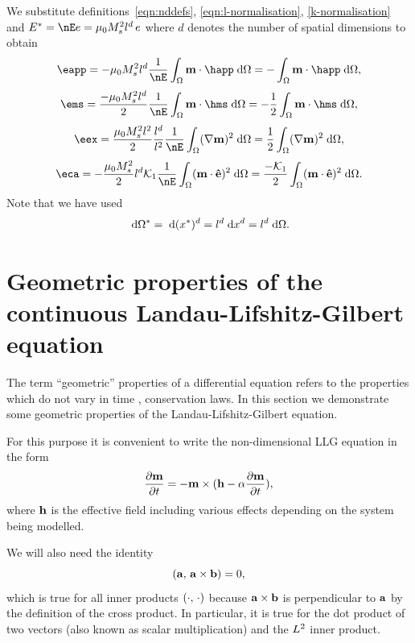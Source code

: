 We substitute definitions~\cref{eqn:nddefs}, \cref{eqn:l-normalisation}, \cref{k-normalisation} and $E^* = \nE e = \mu_0 M_s^2 l^d \, e$ where $d$ denotes the number of spatial dimensions to obtain
\begin{equation*}
  \eapp = -\mu_0 M_s^2 l^d \frac{1}{\nE} \int_{\magd} \mv \cdot \happ \d \magd
  = - \int_{\magd} \mv \cdot \happ \d \magd,
\end{equation*}
\begin{equation}
  \ems = \frac{-\mu_0 M_s^2 l^d}{2} \frac{1}{\nE} \int_{\magd} \mv \cdot \hms \d \magd
  = -\frac{1}{2} \int_{\magd} \mv \cdot \hms \d \magd,
\end{equation}
\begin{equation*}
  \eex =  \frac{\mu_0 M_s^2 l^2}{2} \frac{l^d}{l^2} \frac{1}{\nE} \int_{\magd} (\nabla \mv)^2 \d \magd
  = \frac{1}{2} \int_{\magd} (\nabla \mv)^2 \d \magd,
\end{equation*}
\begin{equation*}
  \eca = - \frac{\mu_0 M_s^2}{2 } l^d \kone \frac{1}{\nE} \int_\magd (\mv \cdot \ev)^2 \d \magd
  = \frac{-\kone}{2} \int_\magd (\mv \cdot \ev)^2 \d \magd.
\end{equation*}
Note that we have used
\begin{equation}
  {\; \text{d}} \Omega^* = {\; \text{d}} (x^*)^d = l^d {\; \text{d}} x^d = l^d {\; \text{d}} \Omega.
\end{equation}


\section{Geometric properties of the continuous Landau-Lifshitz-Gilbert equation}
\label{sec:prop-cont-llg}

The term ``geometric'' properties of a differential equation refers to the properties which do not vary in time \cite[73]{Iserles2009}, \ie conservation laws.
In this section we demonstrate some geometric properties of the Landau-Lifshitz-Gilbert equation.

For this purpose it is convenient to write the non-dimensional LLG equation in the form
\begin{equation}
  \label{eq:llg-prop-form}
  \frac{\partial \mathbf{m}}{\partial t} = - \mathbf{m} \times( \mathbf{h} - \alpha \frac{\partial \mathbf{m}}{\partial t}),
\end{equation}
where $\mathbf{h}$ is the effective field including various effects depending on the system being modelled.

We will also need the identity
\begin{equation}
  \label{eq:dot-cross-id}
  \left({\mathbf{a}},\, {\mathbf{a}} \times {\mathbf{b}} \right) = 0,
\end{equation}
which is true for all inner products $\left(\cdot,\, \cdot \right)$ because ${\mathbf{a}} \times {\mathbf{b}}$ is perpendicular to ${\mathbf{a}}$ by the definition of the cross product.
In particular, it is true for the dot product of two vectors (also known as scalar multiplication) and the $L^2$ inner product.

